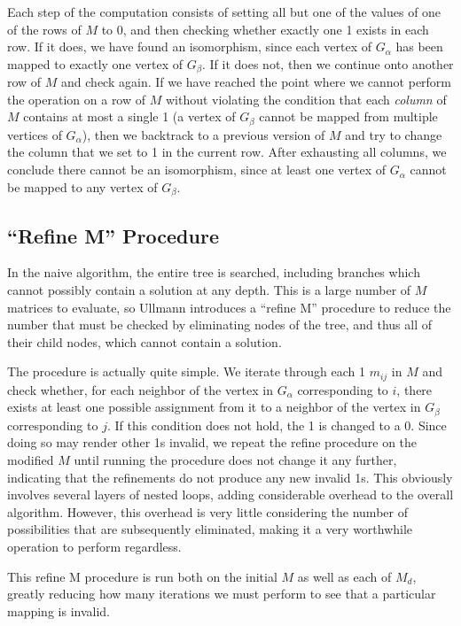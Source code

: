 \documentclass{article}
\begin{document}
  Each step of the computation consists of setting all but one of the values of one of the rows of $M$ to 0, and then checking whether exactly one 1 exists in each row. If it does, we have found an isomorphism, since each vertex of $G_\alpha$ has been mapped to exactly one vertex of $G_\beta$. If it does not, then we continue onto another row of $M$ and check again. If we have reached the point where we cannot perform the operation on a row of $M$ without violating the condition that each \textit{column} of $M$ contains at most a single 1 (a vertex of $G_\beta$ cannot be mapped from multiple vertices of $G_\alpha$), then we backtrack to a previous version of $M$ and try to change the column that we set to 1 in the current row. After exhausting all columns, we conclude there cannot be an isomorphism, since at least one vertex of $G_\alpha$ cannot be mapped to any vertex of $G_\beta$.\cite{ullmann}

  \subsection{``Refine M'' Procedure}

  In the naive algorithm, the entire tree is searched, including branches which cannot possibly contain a solution at any depth. This is a large number of $M$ matrices to evaluate, so Ullmann introduces a ``refine M'' procedure to reduce the number that must be checked by eliminating nodes of the tree, and thus all of their child nodes, which cannot contain a solution.

  The procedure is actually quite simple. We iterate through each 1 $m_{ij}$ in $M$ and check whether, for each neighbor of the vertex in $G_\alpha$ corresponding to $i$, there exists at least one possible assignment from it to a neighbor of the vertex in $G_\beta$ corresponding to $j$. If this condition does not hold, the 1 is changed to a 0. Since doing so may render other 1s invalid, we repeat the refine procedure on the modified $M$ until running the procedure does not change it any further, indicating that the refinements do not produce any new invalid 1s. This obviously involves several layers of nested loops, adding considerable overhead to the overall algorithm. However, this overhead is very little considering the number of possibilities that are subsequently eliminated, making it a very worthwhile operation to perform regardless.

  This refine M procedure is run both on the initial $M$ as well as each of $M_d$, greatly reducing how many iterations we must perform to see that a particular mapping is invalid.
\end{document}
